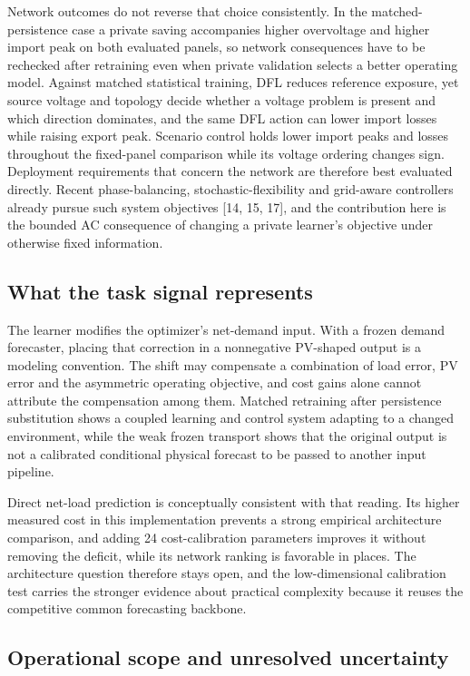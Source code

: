\documentclass[pdflatex,Numbered,sn-basic]{sn-jnl}
\begin{document}
Network outcomes do not reverse that choice consistently. In the matched-persistence case a private saving accompanies higher overvoltage and higher import peak on both evaluated panels, so network consequences have to be rechecked after retraining even when private validation selects a better operating model. Against matched statistical training, DFL reduces reference exposure, yet source voltage and topology decide whether a voltage problem is present and which direction dominates, and the same DFL action can lower import losses while raising export peak. Scenario control holds lower import peaks and losses throughout the fixed-panel comparison while its voltage ordering changes sign. Deployment requirements that concern the network are therefore best evaluated directly. Recent phase-balancing, stochastic-flexibility and grid-aware controllers already pursue such system objectives [14, 15, 17], and the contribution here is the bounded AC consequence of changing a private learner's objective under otherwise fixed information.

\subsection{What the task signal represents}

The learner modifies the optimizer's net-demand input. With a frozen demand forecaster, placing that correction in a nonnegative PV-shaped output is a modeling convention. The shift may compensate a combination of load error, PV error and the asymmetric operating objective, and cost gains alone cannot attribute the compensation among them. Matched retraining after persistence substitution shows a coupled learning and control system adapting to a changed environment, while the weak frozen transport shows that the original output is not a calibrated conditional physical forecast to be passed to another input pipeline.

Direct net-load prediction is conceptually consistent with that reading. Its higher measured cost in this implementation prevents a strong empirical architecture comparison, and adding 24 cost-calibration parameters improves it without removing the deficit, while its network ranking is favorable in places. The architecture question therefore stays open, and the low-dimensional calibration test carries the stronger evidence about practical complexity because it reuses the competitive common forecasting backbone.

\subsection{Operational scope and unresolved uncertainty}
\end{document}
